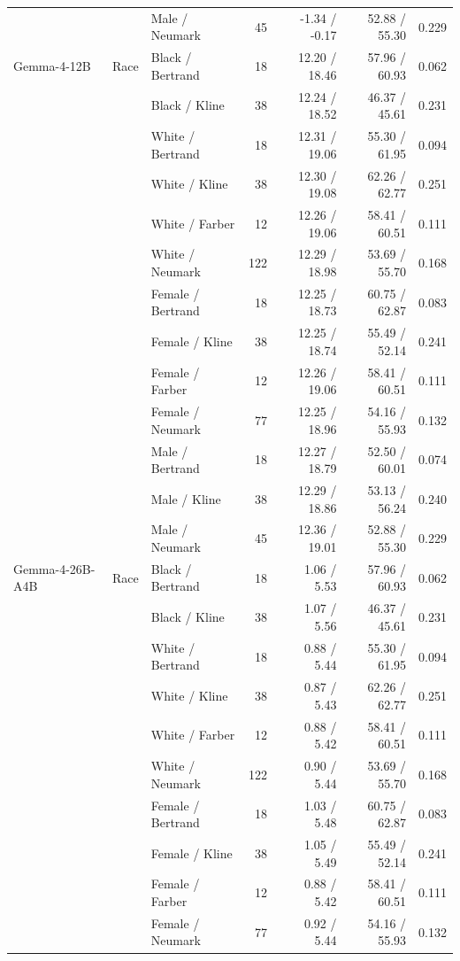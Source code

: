 \begin{longtable}{@{}lllrrrr@{}}
 &  & Male / Neumark & 45 & -1.34 / -0.17 & 52.88 / 55.30 & 0.229 \\
\addlinespace
Gemma-4-12B & Race & Black / Bertrand & 18 & 12.20 / 18.46 & 57.96 / 60.93 & 0.062 \\
 &  & Black / Kline & 38 & 12.24 / 18.52 & 46.37 / 45.61 & 0.231 \\
 &  & White / Bertrand & 18 & 12.31 / 19.06 & 55.30 / 61.95 & 0.094 \\
 &  & White / Kline & 38 & 12.30 / 19.08 & 62.26 / 62.77 & 0.251 \\
 &  & White / Farber & 12 & 12.26 / 19.06 & 58.41 / 60.51 & 0.111 \\
 &  & White / Neumark & 122 & 12.29 / 18.98 & 53.69 / 55.70 & 0.168 \\
 &  & Female / Bertrand & 18 & 12.25 / 18.73 & 60.75 / 62.87 & 0.083 \\
 &  & Female / Kline & 38 & 12.25 / 18.74 & 55.49 / 52.14 & 0.241 \\
 &  & Female / Farber & 12 & 12.26 / 19.06 & 58.41 / 60.51 & 0.111 \\
 &  & Female / Neumark & 77 & 12.25 / 18.96 & 54.16 / 55.93 & 0.132 \\
 &  & Male / Bertrand & 18 & 12.27 / 18.79 & 52.50 / 60.01 & 0.074 \\
 &  & Male / Kline & 38 & 12.29 / 18.86 & 53.13 / 56.24 & 0.240 \\
 &  & Male / Neumark & 45 & 12.36 / 19.01 & 52.88 / 55.30 & 0.229 \\
\addlinespace
Gemma-4-26B-A4B & Race & Black / Bertrand & 18 & 1.06 / 5.53 & 57.96 / 60.93 & 0.062 \\
 &  & Black / Kline & 38 & 1.07 / 5.56 & 46.37 / 45.61 & 0.231 \\
 &  & White / Bertrand & 18 & 0.88 / 5.44 & 55.30 / 61.95 & 0.094 \\
 &  & White / Kline & 38 & 0.87 / 5.43 & 62.26 / 62.77 & 0.251 \\
 &  & White / Farber & 12 & 0.88 / 5.42 & 58.41 / 60.51 & 0.111 \\
 &  & White / Neumark & 122 & 0.90 / 5.44 & 53.69 / 55.70 & 0.168 \\
 &  & Female / Bertrand & 18 & 1.03 / 5.48 & 60.75 / 62.87 & 0.083 \\
 &  & Female / Kline & 38 & 1.05 / 5.49 & 55.49 / 52.14 & 0.241 \\
 &  & Female / Farber & 12 & 0.88 / 5.42 & 58.41 / 60.51 & 0.111 \\
 &  & Female / Neumark & 77 & 0.92 / 5.44 & 54.16 / 55.93 & 0.132 \\

\end{longtable}
